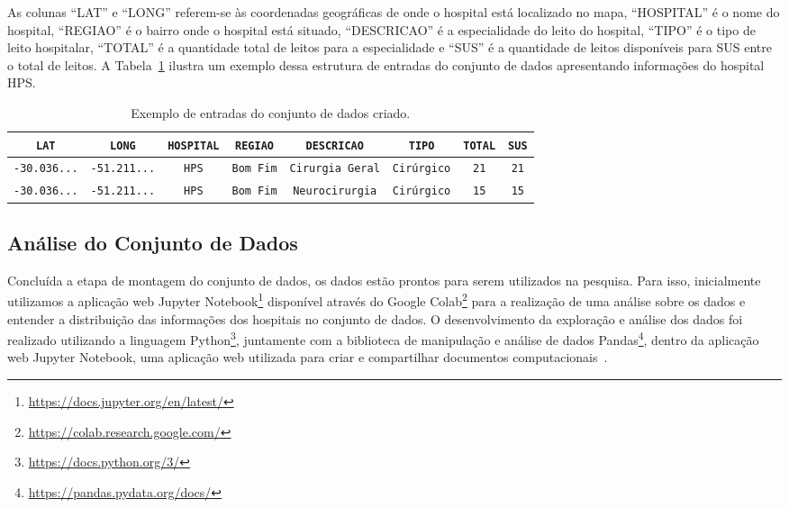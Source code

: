 As colunas ``LAT'' e ``LONG'' referem-se às coordenadas geográficas de onde o hospital está localizado no mapa, ``HOSPITAL'' é o nome do hospital, ``REGIAO'' é o bairro onde o hospital está situado, ``DESCRICAO'' é a especialidade do leito do hospital, ``TIPO'' é o tipo de leito hospitalar, ``TOTAL'' é a quantidade total de leitos para a especialidade e ``SUS'' é a quantidade de leitos disponíveis para SUS entre o total de leitos. A Tabela~\ref{table:3} ilustra um exemplo dessa estrutura de entradas do conjunto de dados apresentando informações do hospital HPS. 
\begin{table}[h!]
\centering
\begin{tabular}{ |c|c|c|c|c|c|c|c| } 
 \hline
 \verb|LAT| & \verb|LONG| & \verb|HOSPITAL| & \verb|REGIAO| & \verb|DESCRICAO| & \verb|TIPO| & \verb|TOTAL| & \verb|SUS|\\ 
 \hline
 \verb|-30.036...| & \verb|-51.211...| & \verb|HPS| & \verb|Bom Fim| & \verb|Cirurgia Geral| & \verb|Cirúrgico| & \verb|21| & \verb|21|\\  \hline
 \verb|-30.036...| & \verb|-51.211...| & \verb|HPS| & \verb|Bom Fim| & \verb|Neurocirurgia| & \verb|Cirúrgico| & \verb|15| & \verb|15|\\
 \hline
\end{tabular}
\caption{Exemplo de entradas do conjunto de dados criado.}
\label{table:3}
\end{table}

\subsection{Análise do Conjunto de Dados}
Concluída a etapa de montagem do conjunto de dados, os dados estão prontos para serem utilizados na pesquisa. Para isso, inicialmente utilizamos a aplicação web Jupyter Notebook\footnote{\url{https://docs.jupyter.org/en/latest/}} disponível através do Google Colab\footnote{\url{https://colab.research.google.com/}} %
para a realização de uma análise sobre os dados e entender a distribuição das informações dos hospitais no conjunto de dados. O desenvolvimento da exploração e análise dos dados foi realizado utilizando a linguagem Python\footnote{\url{https://docs.python.org/3/}}, juntamente com a biblioteca de manipulação e análise de dados Pandas\footnote{\url{https://pandas.pydata.org/docs/}}, dentro da aplicação web Jupyter Notebook, uma aplicação web utilizada para criar e compartilhar documentos computacionais~\cite{JUPYTER}. 

